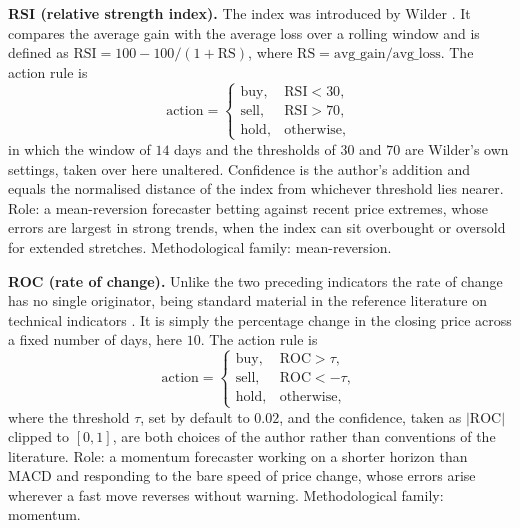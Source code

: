 \textbf{RSI (relative strength index).} The index was introduced by Wilder \cite{wilder1978}. It compares the average gain with the average loss over a rolling window and is defined as $\mathrm{RSI} = 100 - 100/(1 + \mathrm{RS})$, where $\mathrm{RS} = \mathrm{avg\_gain}/\mathrm{avg\_loss}$. The action rule is
\begin{equation}
\mathrm{action} =
\begin{cases}
\mathrm{buy}, & \mathrm{RSI} < 30, \\
\mathrm{sell}, & \mathrm{RSI} > 70, \\
\mathrm{hold}, & \mathrm{otherwise},
\end{cases}
\label{eq:rsi_rule}
\end{equation}
in which the window of $14$ days and the thresholds of $30$ and $70$ are Wilder's own settings, taken over here unaltered. Confidence is the author's addition and equals the normalised distance of the index from whichever threshold lies nearer. Role: a mean-reversion forecaster betting against recent price extremes, whose errors are largest in strong trends, when the index can sit overbought or oversold for extended stretches. Methodological family: mean-reversion.

\textbf{ROC (rate of change).} Unlike the two preceding indicators the rate of change has no single originator, being standard material in the reference literature on technical indicators \cite{achelis2000,murphy1999}. It is simply the percentage change in the closing price across a fixed number of days, here $10$. The action rule is
\begin{equation}
\mathrm{action} =
\begin{cases}
\mathrm{buy}, & \mathrm{ROC} > \tau, \\
\mathrm{sell}, & \mathrm{ROC} < -\tau, \\
\mathrm{hold}, & \mathrm{otherwise},
\end{cases}
\label{eq:roc_rule}
\end{equation}
where the threshold $\tau$, set by default to $0.02$, and the confidence, taken as $|\mathrm{ROC}|$ clipped to $[0, 1]$, are both choices of the author rather than conventions of the literature. Role: a momentum forecaster working on a shorter horizon than MACD and responding to the bare speed of price change, whose errors arise wherever a fast move reverses without warning. Methodological family: momentum.

